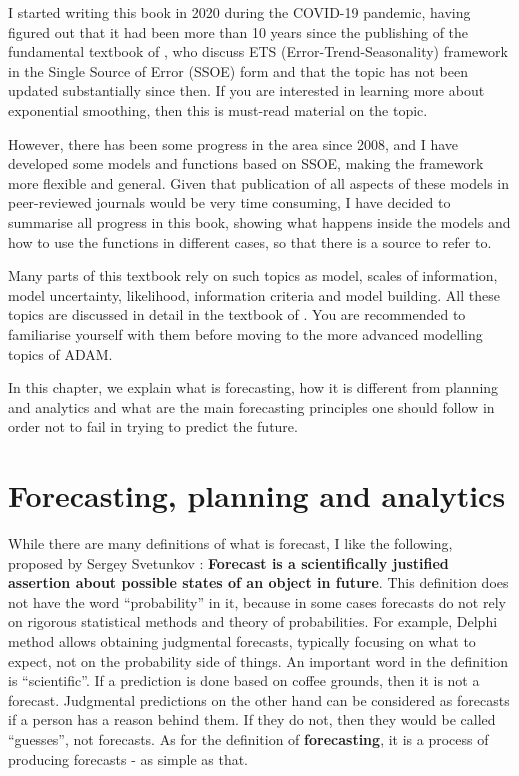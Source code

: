 \documentclass[
]{book}
\theoremstyle{definition}
\theoremstyle{definition}
\theoremstyle{definition}
\theoremstyle{definition}
\theoremstyle{remark}
\begin{document}
I started writing this book in 2020 during the COVID-19 pandemic, having figured out that it had been more than 10 years since the publishing of the fundamental textbook of \citep{Hyndman2008b}, who discuss ETS (Error-Trend-Seasonality) framework in the Single Source of Error (SSOE) form and that the topic has not been updated substantially since then. If you are interested in learning more about exponential smoothing, then this is must-read material on the topic.

However, there has been some progress in the area since 2008, and I have developed some models and functions based on SSOE, making the framework more flexible and general. Given that publication of all aspects of these models in peer-reviewed journals would be very time consuming, I have decided to summarise all progress in this book, showing what happens inside the models and how to use the functions in different cases, so that there is a source to refer to.

Many parts of this textbook rely on such topics as model, scales of information, model uncertainty, likelihood, information criteria and model building. All these topics are discussed in detail in the textbook of \citet{SvetunkovSBA}. You are recommended to familiarise yourself with them before moving to the more advanced modelling topics of ADAM.

In this chapter, we explain what is forecasting, how it is different from planning and analytics and what are the main forecasting principles one should follow in order not to fail in trying to predict the future.

\hypertarget{forecastingPlanningAnalytics}{%
\section{Forecasting, planning and analytics}\label{forecastingPlanningAnalytics}}

While there are many definitions of what is forecast, I like the following, proposed by Sergey Svetunkov \citep{Svetunkov2014Textbook}: \textbf{Forecast is a scientifically justified assertion about possible states of an object in future}. This definition does not have the word ``probability'' in it, because in some cases forecasts do not rely on rigorous statistical methods and theory of probabilities. For example, Delphi method allows obtaining judgmental forecasts, typically focusing on what to expect, not on the probability side of things. An important word in the definition is ``scientific''. If a prediction is done based on coffee grounds, then it is not a forecast. Judgmental predictions on the other hand can be considered as forecasts if a person has a reason behind them. If they do not, then they would be called ``guesses'', not forecasts. As for the definition of \textbf{forecasting}, it is a process of producing forecasts - as simple as that.
\end{document}
